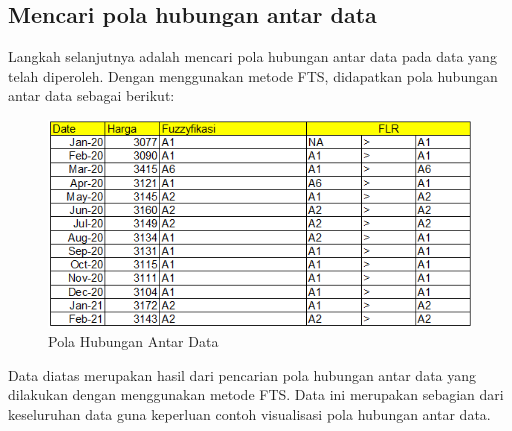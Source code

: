 \documentclass[conference]{IEEEtran}
\begin{document}
\subsection{Mencari pola hubungan antar data}
Langkah selanjutnya adalah mencari pola hubungan antar data pada data yang telah diperoleh. Dengan menggunakan metode FTS, didapatkan pola hubungan antar data sebagai berikut:
\begin{figure}[H]
    \centering
    \includegraphics[scale=0.5]{images/Pola data.png} 
    \caption{Pola Hubungan Antar Data}
\end{figure}
Data diatas merupakan hasil dari pencarian pola hubungan antar data yang dilakukan dengan menggunakan metode FTS. Data ini merupakan sebagian dari keseluruhan data guna keperluan contoh visualisasi pola hubungan antar data.
\end{document}
